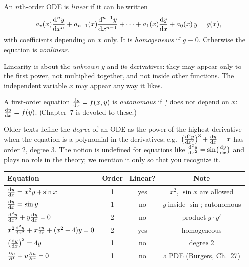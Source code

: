 \begin{definition}[Linear]\label{def:ch01-linear}
An $n$th-order ODE is \emph{linear} if it can be written
\begin{equation}\label{eq:ch01-linear}
  a_n(x)\frac{\mathrm{d}^{n}y}{\mathrm{d}x^{n}} + a_{n-1}(x)\frac{\mathrm{d}^{n-1}y}{\mathrm{d}x^{n-1}} + \dots
  + a_1(x)\frac{\mathrm{d}y}{\mathrm{d}x} + a_0(x)\,y = g(x),
\end{equation}
with coefficients depending on $x$ only. It is \emph{homogeneous} if
$g\equiv 0$. Otherwise the equation is \emph{nonlinear}.
\end{definition}

Linearity is about the \emph{unknown} $y$ and its derivatives: they may appear
only to the first power, not multiplied together, and not inside other
functions. The independent variable $x$ may appear any way it likes.

\begin{definition}[Autonomous]\label{def:ch01-autonomous}
A first-order equation $\frac{\mathrm{d}y}{\mathrm{d}x} = f(x,y)$ is \emph{autonomous} if $f$ does
not depend on $x$: $\frac{\mathrm{d}y}{\mathrm{d}x} = f(y)$. (Chapter~7 is devoted to these.)
\end{definition}

\begin{remark}[On ``degree'']\label{rem:ch01-degree}
Older texts define the \emph{degree} of an ODE as the power of the highest
derivative when the equation is a polynomial in the derivatives; e.g.\
$\bigl(\frac{\mathrm{d}^{2}y}{\mathrm{d}x^{2}}\bigr)^3 + \frac{\mathrm{d}y}{\mathrm{d}x} = x$ has order $2$, degree $3$. The
notion is undefined for equations like $\frac{\mathrm{d}^{2}y}{\mathrm{d}x^{2}} = \sin\bigl(\frac{\mathrm{d}y}{\mathrm{d}x}\bigr)$
and plays no role in the theory; we mention it only so that you recognize it.
\end{remark}

\begin{example}[Classification]\label{ex:ch01-classify}
\begin{center}
\begin{tabular}{@{}lccc@{}}
  \toprule
  Equation & Order & Linear? & Note \\
  \midrule
  $\frac{\mathrm{d}y}{\mathrm{d}x} = x^2y + \sin x$ & 1 & yes & $x^2$, $\sin x$ are allowed \\
  $\frac{\mathrm{d}y}{\mathrm{d}x} = \sin y$ & 1 & no & $y$ inside $\sin$; autonomous \\
  $\frac{\mathrm{d}^{2}y}{\mathrm{d}x^{2}} + y\frac{\mathrm{d}y}{\mathrm{d}x} = 0$ & 2 & no & product $y\cdot y'$ \\
  $x^2\frac{\mathrm{d}^{2}y}{\mathrm{d}x^{2}} + x\frac{\mathrm{d}y}{\mathrm{d}x} + (x^2-4)y = 0$ & 2 & yes & homogeneous \\
  $\bigl(\frac{\mathrm{d}y}{\mathrm{d}x}\bigr)^2 = 4y$ & 1 & no & degree 2 \\
  $\frac{\partial u}{\partial t} + u\frac{\partial u}{\partial x} = 0$ & 1 & no & a PDE (Burgers, Ch.~27) \\
  \bottomrule
\end{tabular}
\end{center}
\end{example}

